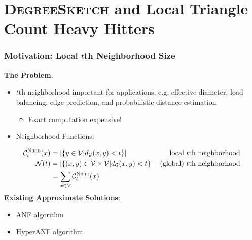 \documentclass{beamer}
\newcommand{\algoname}[1]{\textnormal{\textsc{#1}}}
\begin{document}
\section{\algoname{DegreeSketch} and Local Triangle Count Heavy Hitters}



\begin{frame}
\frametitle{Motivation: Local $t$th Neighborhood Size}

\textbf{The Problem}:
\begin{itemize}
	\item $t$th neighborhood important for applications, e.g. effective diameter, load balancing, edge prediction, and probabilistic distance estimation
	\begin{itemize}
		\item Exact computation expensive!
	\end{itemize}
	\item Neighborhood Functions:
\end{itemize}
%
\vspace{-0.5em}
\begin{align*}
	\mathcal{C}^{\algoname{Nbhd}}_t(x) 
	&= |\{y \in \mathcal{V} | d_\mathcal{G}(x, y) < t\}| 
	& \textnormal{local $t$th neighborhood} \\
	\mathcal{N}(t)  
	&=  |\{(x, y) \in \mathcal{V} \times \mathcal{V} | d_\mathcal{G}(x, y) < t\}|
	& \textnormal{(global) $t$th neighborhood}  \\
	&= \sum_{x \in \mathcal{V}} \mathcal{C}^{\algoname{Nbhd}}_t(x)  &
\end{align*}
%
\textbf{Existing Approximate Solutions}:
\begin{itemize}
	\item ANF algorithm \cite{palmer2002anf}
	\item HyperANF algorithm \cite{boldi2011hyperanf}
\end{itemize}


\end{frame}

\end{document}
